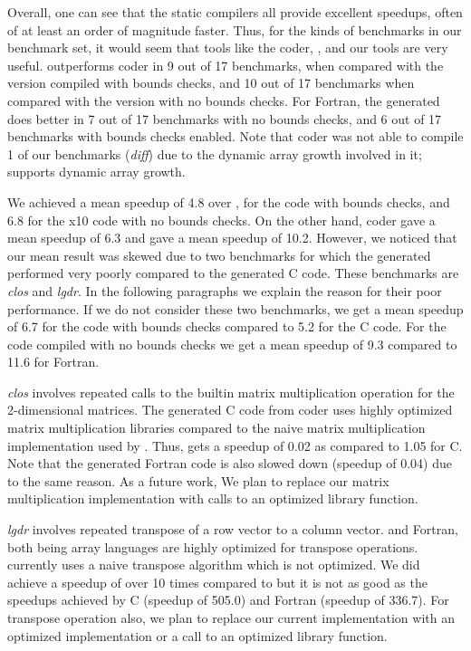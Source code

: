 Overall, one can see that the static compilers all provide excellent
speedups, often of at least an order of magnitude faster.  Thus, for the
kinds of benchmarks in our benchmark set, it would seem that tools like
the \matlab coder, \mctwofor, and our \mixten tools are very useful.
\mixten outperforms \matlab coder in 9 out of 17 benchmarks, when
compared with the \xten version compiled with bounds checks, and 10 out
of 17 benchmarks when compared with the version with no bounds checks.
For Fortran, the generated \xten does better in 7 out of 17 benchmarks
with no bounds checks, and 6 out of 17 benchmarks with bounds checks
enabled.  Note that \matlab coder was not able to compile 1 of our
benchmarks (\emph{diff}) due to the dynamic array
growth involved in it; \mixten supports dynamic array growth.  

We achieved a mean speedup of 4.8
over \matlab, for the \xten code with bounds checks, and 6.8 for the x10 code
with no bounds checks.  On the other hand, \matlab coder gave a mean speedup of
6.3 and \mctwofor gave a mean speedup of 10.2.  However, we noticed that our
mean result was skewed due to two benchmarks for which the generated \xten
performed very poorly compared to the generated C code.  These benchmarks are
\emph{clos} and \emph{lgdr}. In the following paragraphs we explain the reason
for their poor performance.  If  we do not consider these two benchmarks, we
get a mean speedup of 6.7 for the \xten code with bounds checks compared to 5.2
for the C code. For the \xten code compiled with no bounds checks we get a mean
speedup of 9.3 compared to 11.6 for Fortran. 

\emph{clos} involves repeated calls to the builtin matrix multiplication
operation for the 2-dimensional matrices. The generated C code from \matlab
coder uses highly optimized matrix multiplication libraries compared to the
naive matrix multiplication implementation used by \mixten. Thus, \mixten gets a
speedup of 0.02 as compared to 1.05 for C. Note that the generated Fortran
code is also slowed down (speedup of 0.04) due to the same reason. As a future
work, We plan to replace our matrix multiplication implementation with calls to
an optimized library function.       

\emph{lgdr} involves repeated transpose of a row vector to a column vector.
\matlab and Fortran, both being array languages are highly optimized for
transpose operations. \mixten currently uses a naive transpose algorithm which
is not optimized. We did achieve a speedup of over 10 times compared to \matlab
but it is not as good as the speedups achieved by C (speedup of 505.0) and
Fortran (speedup of 336.7). For transpose operation also, we plan to replace
our current implementation with an optimized implementation or a call to an
optimized library function.  

